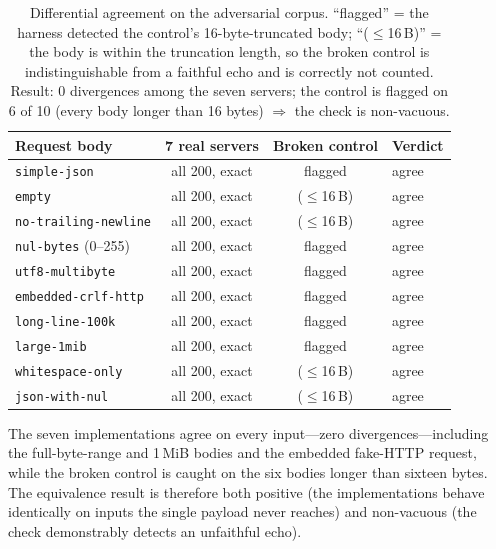 \documentclass[11pt,letterpaper]{article}
\begin{document}
\begin{table}[htbp]
\centering
\small
\begin{tabularx}{\linewidth}{@{}lccX@{}}
\toprule
Request body & 7 real servers & Broken control & Verdict \\
\midrule
\texttt{simple-json}          & all 200, exact & flagged       & agree \\
\texttt{empty}                & all 200, exact & ($\leq$16\,B) & agree \\
\texttt{no-trailing-newline}  & all 200, exact & ($\leq$16\,B) & agree \\
\texttt{nul-bytes} (0--255)   & all 200, exact & flagged       & agree \\
\texttt{utf8-multibyte}       & all 200, exact & flagged       & agree \\
\texttt{embedded-crlf-http}   & all 200, exact & flagged       & agree \\
\texttt{long-line-100k}       & all 200, exact & flagged       & agree \\
\texttt{large-1mib}           & all 200, exact & flagged       & agree \\
\texttt{whitespace-only}      & all 200, exact & ($\leq$16\,B) & agree \\
\texttt{json-with-nul}        & all 200, exact & ($\leq$16\,B) & agree \\
\bottomrule
\end{tabularx}
\caption{Differential agreement on the adversarial corpus. ``flagged'' = the
harness detected the control's 16-byte-truncated body; ``($\leq$16\,B)'' = the
body is within the truncation length, so the broken control is indistinguishable
from a faithful echo and is correctly not counted. Result: 0 divergences among the
seven servers; the control is flagged on 6 of 10 (every body longer than 16 bytes)
$\Rightarrow$ the check is non-vacuous.}
\label{tab:differential}
\end{table}

The seven implementations agree on every input---zero divergences---including the
full-byte-range and 1\,MiB bodies and the embedded fake-HTTP request, while the
broken control is caught on the six bodies longer than sixteen bytes. The
equivalence result is therefore both positive (the implementations behave
identically on inputs the single payload never reaches) and non-vacuous (the check
demonstrably detects an unfaithful echo).
\end{document}
